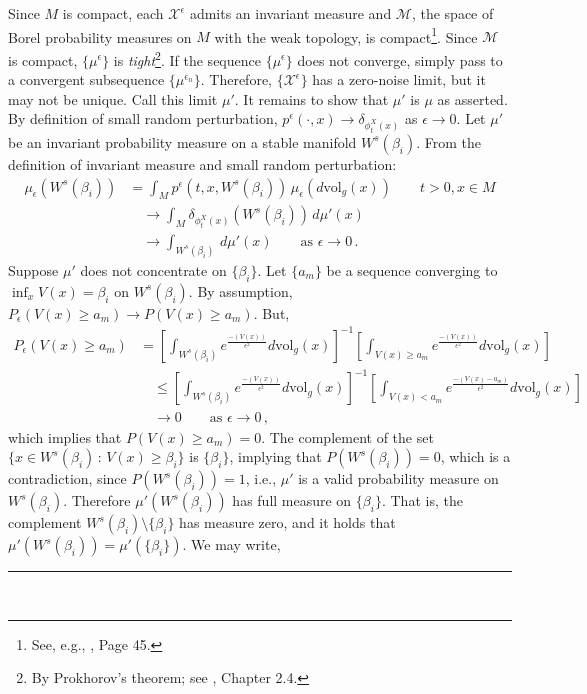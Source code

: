 \documentclass[12pt]{article}
\newcommand{\BlackBox}{\rule{1.5ex}{1.5ex}}  %
\renewenvironment{proof}{\par\noindent{\bf Proof\ }}{\hfill\BlackBox\\[2mm]}
\newenvironment{proof}{\par\noindent{\bf Proof\ }}{\hfill\BlackBox\\[2mm]}
\begin{document}
\begin{proof}
    Since $M$ is compact, each $\mathcal{X^{\epsilon}}$ admits an invariant measure and $\mathcal{M}$, the space of Borel probability measures on $M$ with the weak topology, is compact\footnote{See, e.g., \cite{parthasarathy2005probability}, Page 45.}. Since $\mathcal{M}$ is compact, $\{\mu^\epsilon\}$ is \textit{tight}\footnote{By Prokhorov's theorem; see \cite{rezakhanlou2015lectures}, Chapter 2.4.}. If the sequence $\{\mu^{\epsilon} \}$ does not converge, simply pass to a convergent subsequence $\{\mu^{\epsilon_{n}} \}$. Therefore, $\{\mathcal{X}^{\epsilon}\}$ has a zero-noise limit, but it may not be unique. Call this limit $\mu'$. It remains to show that $\mu'$ is $\mu$ as asserted. By definition of small random perturbation, $p^{\epsilon}(\cdot, x) \rightarrow \delta_{\phi_t^X(x)}$ as $\epsilon \rightarrow 0$. Let $\mu'$ be an invariant probability measure on a stable manifold $W^s(\beta_i)$. From the definition of invariant measure and small random perturbation:
    \begin{align}
        \mu_{\epsilon}(W^s(\beta_i)) &= \int_M p^{\epsilon}(t,x,W^s(\beta_i)) \,\mu_{\epsilon}\left(d\text{vol}_g(x)\right) \qquad t>0,x\in M \nonumber \\ 
        &\quad \rightarrow \int_M \delta_{\phi_t^X(x)} \left( W^s(\beta_i) \right) \, d \mu'(x) \nonumber \\ 
        &\quad \rightarrow \int_{W^s(\beta_i)} \, d \mu'(x)
        \qquad \text{as } \epsilon \rightarrow 0 \nonumber \,.
    \end{align} 
    Suppose $\mu'$ does not concentrate on $\{\beta_i\}$. Let $\{a_{m} \}$ be a sequence converging to $\inf_x V(x) = \beta_i$ on $W^s(\beta_i)$. By assumption, ${P_{\epsilon}(V(x) \geq a_m ) \rightarrow P(V(x) \geq a_m )}$. But,
    \begin{align}
        P_{\epsilon}(V(x) \geq a_{m} ) &= \left[ \int_{W^s(\beta_i)} e^{\frac{-({V(x)})}{\epsilon^2}} d\text{vol}_g(x)\right]^{-1} \left[ \int_{V(x) \geq a_{m}} e^{\frac{{-(V(x))}}{\epsilon^2}} d\text{vol}_g(x)\right] \nonumber \\
        &\quad \leq \left[ \int_{W^s(\beta_i)} e^{\frac{-({V(x)})}{\epsilon^2}} d\text{vol}_g(x)\right]^{-1} \left[ \int_{V(x) < a_{m}} e^{\frac{{- (V(x) - a_{m})}}{\epsilon^2}} d\text{vol}_g(x)\right] \nonumber \\
        &\quad \rightarrow 0 \qquad \text{as } \epsilon \rightarrow 0 \nonumber \, ,
    \end{align} 
    which implies that $P(V(x) \geq a_{m} ) = 0$. The complement of the set $\{ x \in W^s(\beta_i) \, : \, V(x) \geq \beta_i\}$ is $\{ \beta_i\}$, implying that $P(W^s(\beta_i))=0$, which is a contradiction, since $P(W^s(\beta_i))=1$, i.e., $\mu'$ is a valid probability measure on $W^s(\beta_i)$. Therefore $\mu'(W^s(\beta_i))$ has full measure on $\{ \beta_i \}$. That is, the complement $W^s(\beta_i) \setminus \{ \beta_i\}$ has measure zero, and it holds that $\mu'(W^s(\beta_i)) = \mu'(\{ \beta_i \})$. We may write,

\end{proof}
\end{document}
